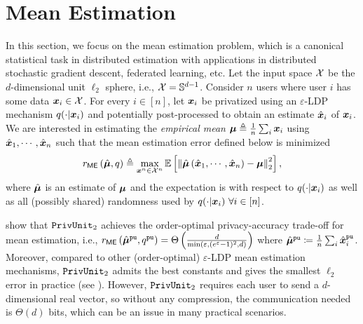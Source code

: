 \section{Mean Estimation}
\label{sec:mean_estimation}
In this section, we focus on the mean estimation problem, which is a canonical statistical task in distributed estimation with applications in distributed stochastic gradient descent, federated learning, etc. 
Let the input space $\mathcal{X}$ be the $d$-dimensional unit $\ell_2$ sphere, i.e.,  $\mathcal{X} = \mathbb{S}^{d-1}$.
Consider $n$ users where user $i$  
has some data ${\boldsymbol{x}}_i \in \mathcal{X}$. For every $i \in [n]$, let ${\boldsymbol{x}}_i$ be privatized using an $\varepsilon$-LDP mechanism $q(\cdot|{\boldsymbol{x}}_i)$ and potentially post-processed to obtain an estimate $\hat{{\boldsymbol{x}}}_i$ of ${\boldsymbol{x}}_i$. We are interested in estimating the \emph{empirical mean} ${\boldsymbol{\mu}} \triangleq \frac{1}{n}\sum_i {\boldsymbol{x}}_i$ using $\hat{{\boldsymbol{x}}}_1,\cdots,\hat{{\boldsymbol{x}}}_n$ such that the mean estimation error defined below is minimized
\begin{equation}\label{eq:rme_def}
     r_{\mathsf{ME}} \left( \hat{{\boldsymbol{\mu}}}, q \right) \triangleq \max_{{\boldsymbol{x}}^n \in \mathcal{X}^n} \mathbb{E}\left[ \left\| \hat{{\boldsymbol{\mu}}}\left( \hat{{\boldsymbol{x}}}_1,\cdots ,\hat{{\boldsymbol{x}}}_n \right) - {\boldsymbol{\mu}} \right\|^2_2 \right],
\end{equation}
where $\hat{{\boldsymbol{\mu}}}$ is an estimate of ${\boldsymbol{\mu}}$ and
the expectation is with respect to $q(\cdot|{\boldsymbol{x}}_i) $ as well as all (possibly shared) randomness used by $q(\cdot|{\boldsymbol{x}}_i)~\forall i \in [n]$.

\cite{BDFKR2018} show that $\texttt{PrivUnit}_2$ achieves the order-optimal privacy-accuracy trade-off for mean estimation, i.e., $r_{\mathsf{ME}} \left( \hat{{\boldsymbol{\mu}}}^\texttt{pu}, q^{\texttt{pu}} \right) = \Theta\left(\frac{d}{\min\left(\varepsilon, (e^\varepsilon-1)^2, d\right)}\right) $ where $\hat{{\boldsymbol{\mu}}}^\texttt{pu} \coloneqq \frac{1}{n}\sum_i \hat{{\boldsymbol{x}}}^\texttt{pu}_i$.
Moreover, compared to other (order-optimal) $\varepsilon$-LDP mean estimation mechanisms, $\texttt{PrivUnit}_2$ admits the best constants and gives the smallest $\ell_2$ error in practice (see \cite{FT21}). However, $\texttt{PrivUnit}_2$ requires each user to send a $d$-dimensional real vector, so without any compression, the communication needed is $\Theta(d)$ bits, which can be an issue in many practical scenarios. 
 
